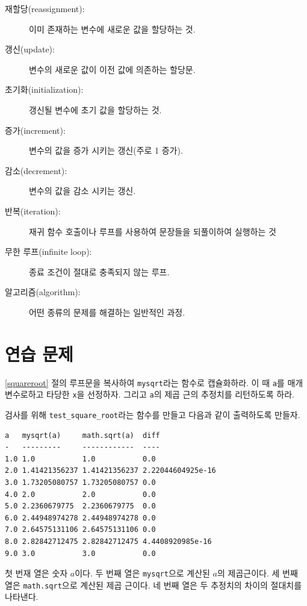 \documentclass[10pt]{book}
\begin{document}
\begin{description}

\item[재할당(reassignment):]  이미 존재하는 변수에 새로운 값을 할당하는 것.

\item[갱신(update):] 변수의 새로운 값이 이전 값에 의존하는 할당문.

\item[초기화(initialization):] 갱신될 변수에 초기 값을 할당하는 것.

\item[증가(increment):] 변수의 값을 증가 시키는 갱신(주로 1 증가).

\item[감소(decrement):] 변수의 값을 감소 시키는 갱신.

\item[반복(iteration):] 재귀 함수 호출이나 루프를 사용하여 문장들을
  되풀이하여 실행하는 것

\item[무한 루프(infinite loop):] 종료 조건이 절대로 충족되지 않는 루프.

\item[알고리즘(algorithm):]  어떤 종류의 문제를 해결하는 일반적인 과정.

\end{description}


\section{연습 문제}

\begin{exercise}

\ref{squareroot} 절의 루프문을 복사하여 \verb"mysqrt"라는 함수로
캡슐화하라.  이 때 {\tt a}를 매개 변수로하고 타당한 {\tt x}을
선정하자.  그리고 {\tt a}의 제곱 근의 추정치를 리턴하도록 하라.

검사를 위해 \verb"test_square_root"라는 함수를 만들고 다음과 같이
출력하도록 만들자.

\begin{verbatim}
a   mysqrt(a)     math.sqrt(a)  diff
-   ---------     ------------  ----
1.0 1.0           1.0           0.0
2.0 1.41421356237 1.41421356237 2.22044604925e-16
3.0 1.73205080757 1.73205080757 0.0
4.0 2.0           2.0           0.0
5.0 2.2360679775  2.2360679775  0.0
6.0 2.44948974278 2.44948974278 0.0
7.0 2.64575131106 2.64575131106 0.0
8.0 2.82842712475 2.82842712475 4.4408920985e-16
9.0 3.0           3.0           0.0
\end{verbatim}
%
첫 번재 열은 숫자 $a$이다.  두 번째 열은 \verb"mysqrt"으로 계산된 $a$의
제곱근이다.  세 번째 열은 {\tt math.sqrt}으로 계산된 제곱 근이다.  네
번째 열은 두 추정치의 차이의 절대치를 나타낸다.
\end{exercise}
\end{document}
